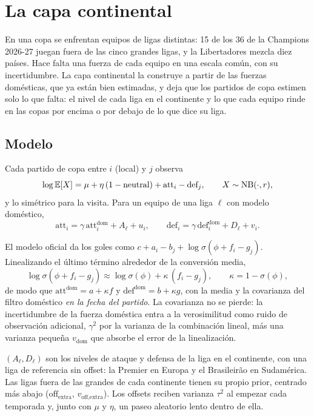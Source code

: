 \chapter{La capa continental}
\label{cap:capa}

En una copa se enfrentan equipos de ligas distintas: 15 de los 36 de la Champions 2026-27 juegan fuera de las cinco grandes ligas, y la Libertadores mezcla diez países. Hace falta una fuerza de cada equipo en una escala común, con su incertidumbre. La capa continental la construye a partir de las fuerzas domésticas, que ya están bien estimadas, y deja que los partidos de copa estimen solo lo que falta: el nivel de cada liga en el continente y lo que cada equipo rinde en las copas por encima o por debajo de lo que dice su liga.

\section{Modelo}

Cada partido de copa entre $i$ (local) y $j$ observa
\begin{equation}
\log\mathbb{E}[X]=\mu+\eta\,(1-\text{neutral})+\text{att}_i-\text{def}_j,\qquad X\sim\operatorname{NB}(\cdot,r),
\label{eq:capa}
\end{equation}
y lo simétrico para la visita. Para un equipo de una liga $\ell$ con modelo doméstico,
\begin{equation}
\text{att}_i=\gamma\,\text{att}^\text{dom}_i+A_\ell+u_i,\qquad \text{def}_i=\gamma\,\text{def}^\text{dom}_i+D_\ell+v_i.
\label{eq:anclaje}
\end{equation}

 El modelo oficial da los goles como $c+a_i-b_j+\log\sigma(\phi+f_i-g_j)$. Linealizando el último término alrededor de la conversión media,
\[
\log\sigma(\phi+f_i-g_j)\approx\log\sigma(\phi)+\kappa\,(f_i-g_j),\qquad \kappa=1-\sigma(\phi),
\]
de modo que $\text{att}^\text{dom}=a+\kappa f$ y $\text{def}^\text{dom}=b+\kappa g$, con la media y la covarianza del filtro doméstico \emph{en la fecha del partido}. La covarianza no se pierde: la incertidumbre de la fuerza doméstica entra a la verosimilitud como ruido de observación adicional, $\gamma^2$ por la varianza de la combinación lineal, más una varianza pequeña $v_\text{dom}$ que absorbe el error de la linealización.

 $(A_\ell,D_\ell)$ son los niveles de ataque y defensa de la liga en el continente, con una liga de referencia sin offset: la Premier en Europa y el Brasileirão en Sudamérica. Las ligas fuera de las grandes de cada continente tienen su propio prior, centrado más abajo ($\text{off}_\text{extra}$, $v_\text{off,extra}$). Los offsets reciben varianza $\tau^2$ al empezar cada temporada y, junto con $\mu$ y $\eta$, un paseo aleatorio lento dentro de ella.

